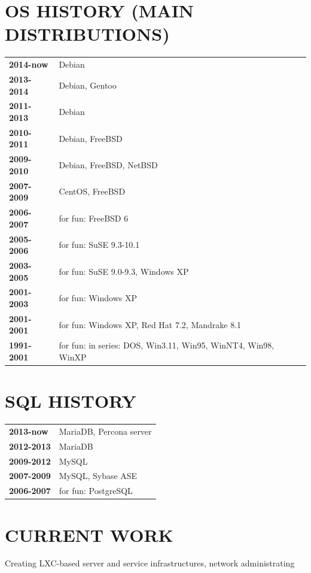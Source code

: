 \begin{resume}
\section{OS HISTORY (MAIN DISTRIBUTIONS)}
\vspace{0.1in} 
\begin{tabular}{ll}
{\bf 2014-now} & Debian\\
{\bf 2013-2014} & Debian, Gentoo\\
{\bf 2011-2013} & Debian\\
{\bf 2010-2011} & Debian, FreeBSD\\
{\bf 2009-2010} & Debian, FreeBSD, NetBSD\\
{\bf 2007-2009} & CentOS, FreeBSD\\
{\bf 2006-2007} & for fun: FreeBSD 6\\
{\bf 2005-2006} & for fun: SuSE 9.3-10.1\\
{\bf 2003-2005} & for fun: SuSE 9.0-9.3, Windows XP\\
{\bf 2001-2003} & for fun: Windows XP\\
{\bf 2001-2001} & for fun: Windows XP, Red Hat 7.2, Mandrake 8.1\\
{\bf 1991-2001} & for fun: in series: DOS, Win3.11, Win95, WinNT4, Win98, WinXP\\
\end{tabular}

\section{SQL HISTORY}
\vspace{0.1in} 
\begin{tabular}{ll}
{\bf 2013-now} & MariaDB, Percona server\\
{\bf 2012-2013} & MariaDB\\
{\bf 2009-2012} & MySQL\\
{\bf 2007-2009} & MySQL, Sybase ASE\\
{\bf 2006-2007} & for fun: PostgreSQL\\
\end{tabular}
\newpage
\section{CURRENT WORK}
\vspace{0.1in} 
    Creating LXC-based server and service infrastructures, network administrating


\end{resume}
